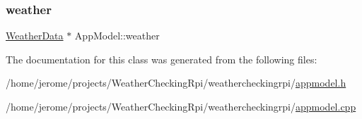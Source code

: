 \subsubsection{\texorpdfstring{weather}{weather}}
{\footnotesize\ttfamily \hyperlink{class_weather_data}{Weather\+Data} $\ast$ App\+Model\+::weather\hspace{0.3cm}{\ttfamily [read]}}



The documentation for this class was generated from the following files\+:\begin{DoxyCompactItemize}
\item 
/home/jerome/projects/\+Weather\+Checking\+Rpi/weathercheckingrpi/\hyperlink{appmodel_8h}{appmodel.\+h}\item 
/home/jerome/projects/\+Weather\+Checking\+Rpi/weathercheckingrpi/\hyperlink{appmodel_8cpp}{appmodel.\+cpp}\end{DoxyCompactItemize}
